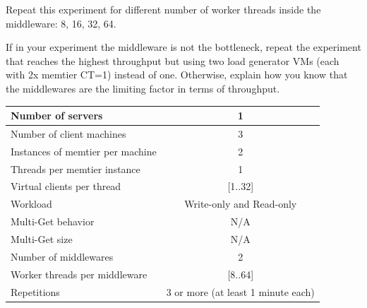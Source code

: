 \documentclass[11pt,a4paper]{article}
\begin{document}
Repeat this experiment for different number of worker threads inside the middleware: 8, 16, 32, 64.

If in your experiment the middleware is not the bottleneck, repeat the experiment that reaches the highest throughput but using two load generator VMs (each with 2x memtier CT=1) instead of one. Otherwise, explain how you know that the middlewares are the limiting factor in terms of throughput.

\begin{center}
	\scriptsize{
		\begin{tabular}{|l|c|}
			\hline Number of servers                & 1                        \\ 
			\hline Number of client machines        & 3                        \\ 
			\hline Instances of memtier per machine & 2                        \\ 
			\hline Threads per memtier instance     & 1                        \\
			\hline Virtual clients per thread       & [1..32]                  \\ 
			\hline Workload                         & Write-only and Read-only \\
			\hline Multi-Get behavior               & N/A                      \\
			\hline Multi-Get size                   & N/A                      \\
			\hline Number of middlewares            & 2                        \\
			\hline Worker threads per middleware    & [8..64]                  \\
			\hline Repetitions                      & 3 or more (at least 1 minute each)                \\ 
			\hline 
		\end{tabular}
	} 
\end{center}
\end{document}
